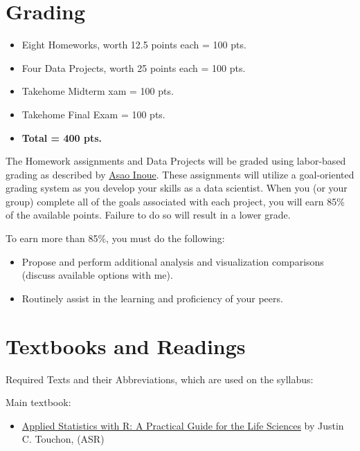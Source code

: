 \documentclass[11pt]{article} %
\begin{document}
\section{Grading}

  \begin{itemize}
    \item Eight Homeworks, worth 12.5 points each = 100 pts.\\
    \item Four Data Projects, worth 25 points each = 100 pts.\\
    \item Takehome Midterm xam = 100 pts.\\
    \item Takehome Final Exam = 100 pts.\\
    \item {\bf Total = 400 pts.}
  \end{itemize}

  The Homework assignments and Data Projects will be graded using labor-based grading as described by \href{http://www.translingualwriting.com/resources/Inoue\%20Contract.pdf}{Asao Inoue}. These assignments will utilize a goal-oriented grading system as you develop your skills as a data scientist.  When you (or your group) complete all of the goals associated with each project, you will earn 85\% of the available points. Failure to do so will result in a lower grade.

To earn more than 85\%, you must do the following:
\begin{itemize}
  \item Propose and perform additional analysis and visualization comparisons (discuss available options with me).
  \item Routinely assist in the learning and proficiency of your peers.
\end{itemize}


\section{Textbooks and Readings}

  Required Texts and their Abbreviations, which are used on the syllabus:
  
  Main textbook:
    
  \begin{itemize}
  \item \href{https://oxford.universitypressscholarship.com/view/10.1093/oso/9780198869979.001.0001/oso-9780198869979}{Applied Statistics with R: A Practical Guide for the Life Sciences} by Justin C. Touchon, (ASR)
  \end{itemize}
    
\end{document}
